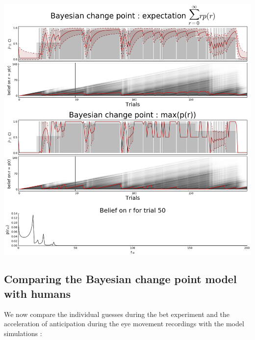 \documentclass[profile,final,english, draft]{article}%
\begin{document}
\begin{center} 
    \includegraphics[width=1\linewidth]{bayesianchangepoint}
\end{center}




\subsection*{Comparing the Bayesian change point model with humans}

We now compare the individual guesses during the bet experiment and the acceleration of anticipation during the eye movement recordings with the model simulations :
\end{document}
